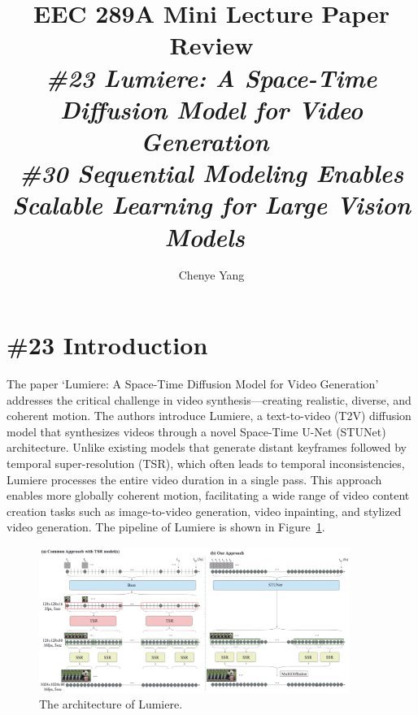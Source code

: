 \documentclass[conference]{IEEEtran}
\theoremstyle{definition}
\theoremstyle{plain}
\theoremstyle{remark}
\begin{document}
\title{EEC 289A Mini Lecture Paper Review\\
\vspace{0.5cm}
\textit{\large\textbf{\#23} Lumiere: A Space-Time Diffusion Model for Video Generation~\cite{bar2024lumiere} \\
\textbf{\#30} Sequential Modeling Enables Scalable Learning for Large Vision Models~\cite{bai2023sequential}}
}

\author{Chenye Yang}

\maketitle


\section{\textbf{\#23} Introduction}
The paper `Lumiere: A Space-Time Diffusion Model for Video Generation'~\cite{bar2024lumiere} addresses the critical challenge in video synthesis—creating realistic, diverse, and coherent motion. 
The authors introduce Lumiere, a text-to-video (T2V) diffusion model that synthesizes videos through a novel Space-Time U-Net (STUNet) architecture. 
Unlike existing models that generate distant keyframes followed by temporal super-resolution (TSR), which often leads to temporal inconsistencies, 
Lumiere processes the entire video duration in a single pass. 
This approach enables more globally coherent motion, facilitating a wide range of video content creation tasks such as image-to-video generation, video inpainting, and stylized video generation.
The pipeline of Lumiere is shown in Figure~\ref{fig:lumiere-pipeline}.
\begin{figure}[!htbp]
    \centering
    \includegraphics[width=0.9\textwidth]{Lumiere-pipeline.png}
    \caption{The architecture of Lumiere.}
    \label{fig:lumiere-pipeline}
\end{figure}
\end{document}
